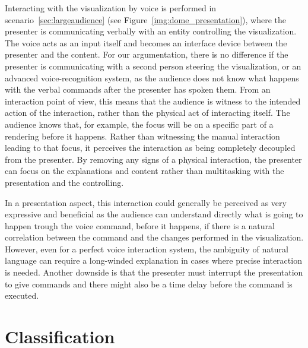 \documentclass[review,journal]{vgtc}         %
\begin{document}
Interacting with the visualization by voice is performed in scenario~\ref{sec:largeaudience} (see Figure~\ref{img:dome_presentation}), where the presenter is communicating verbally with an entity controlling the visualization.
The voice acts as an input itself and becomes an interface device between the presenter and the content.
For our argumentation, there is no difference if the presenter is communicating with a second person steering the visualization, or an advanced voice-recognition system, as the audience does not know what happens with the verbal commands after the presenter has spoken them.
%
From an interaction point of view, this means that the audience is witness to the intended action of the interaction, rather than the physical act of interacting itself.
The audience knows that, for example, the focus will be on a specific part of a rendering before it happens.
Rather than witnessing the manual interaction leading to that focus, it perceives the interaction as being completely decoupled from the presenter.
By removing any signs of a physical interaction, the presenter can focus on the explanations and content rather than multitasking with the presentation and the controlling.

In a presentation aspect, this interaction could generally be perceived as very expressive and beneficial as the audience can understand directly what is going to happen trough the voice command, before it happens, if there is a natural correlation between the command and the changes performed in the visualization.
However, even for a perfect voice interaction system, the ambiguity of natural language can require a long-winded explanation in cases where precise interaction is needed. Another downside is that the presenter must interrupt the presentation to give commands and there might also be a time delay before the command is executed.

\section{Classification} \label{sec:classification}
\end{document}
